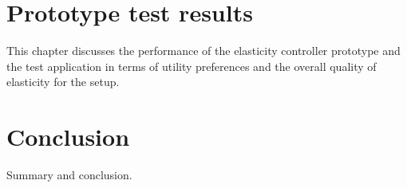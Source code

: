 \documentclass[english]{tktltiki2}
\theoremstyle{definition}
\theoremstyle{remark}
\begin{document}
\section{Prototype test results}
\label{relatedwork}

This chapter discusses the performance of the elasticity controller prototype
and the test application in terms of utility preferences and the overall quality
of elasticity for the setup.

\section{Conclusion}
\label{conclusion}

Summary and conclusion.


%
%
% 
%




\end{document}
